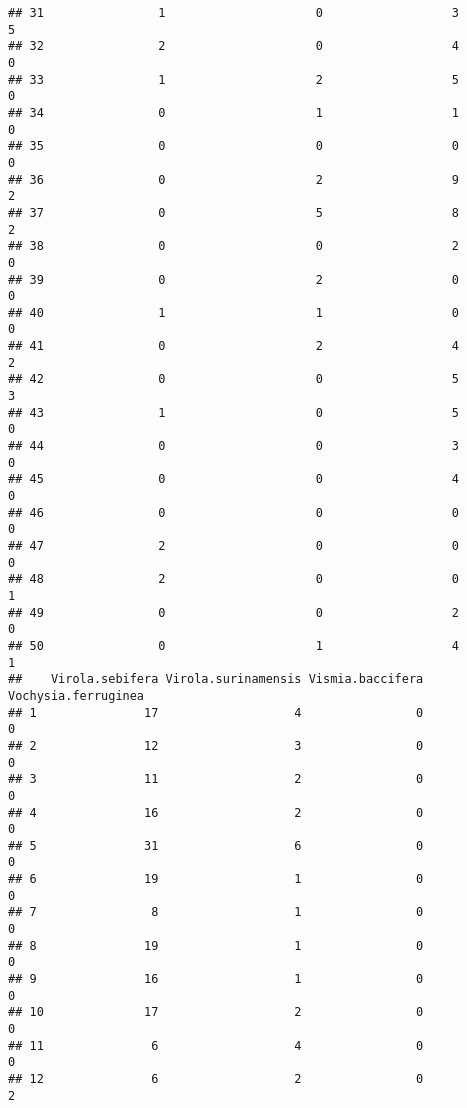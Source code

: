\documentclass[
]{article}
\begin{document}
\begin{verbatim}
## 31                1                     0                  3                 5
## 32                2                     0                  4                 0
## 33                1                     2                  5                 0
## 34                0                     1                  1                 0
## 35                0                     0                  0                 0
## 36                0                     2                  9                 2
## 37                0                     5                  8                 2
## 38                0                     0                  2                 0
## 39                0                     2                  0                 0
## 40                1                     1                  0                 0
## 41                0                     2                  4                 2
## 42                0                     0                  5                 3
## 43                1                     0                  5                 0
## 44                0                     0                  3                 0
## 45                0                     0                  4                 0
## 46                0                     0                  0                 0
## 47                2                     0                  0                 0
## 48                2                     0                  0                 1
## 49                0                     0                  2                 0
## 50                0                     1                  4                 1
##    Virola.sebifera Virola.surinamensis Vismia.baccifera Vochysia.ferruginea
## 1               17                   4                0                   0
## 2               12                   3                0                   0
## 3               11                   2                0                   0
## 4               16                   2                0                   0
## 5               31                   6                0                   0
## 6               19                   1                0                   0
## 7                8                   1                0                   0
## 8               19                   1                0                   0
## 9               16                   1                0                   0
## 10              17                   2                0                   0
## 11               6                   4                0                   0
## 12               6                   2                0                   2

\end{verbatim}
\end{document}
